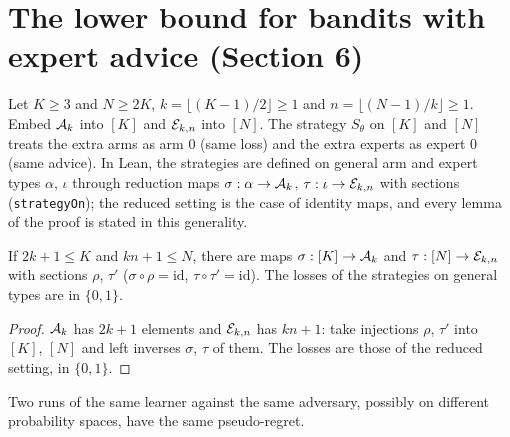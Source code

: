 \chapter{The lower bound for bandits with expert advice (Section 6)}
\label{chap:main}

\begin{definition}
  \label{def:embedding}
  \leanok
  Let $K \ge 3$ and $N \ge 2K$, $k = \lfloor (K - 1)/2 \rfloor \ge 1$ and
  $n = \lfloor (N - 1)/k \rfloor \ge 1$. Embed $\mathcal{A}_k$ into $[K]$ and $\mathcal{E}_{k,n}$ into $[N]$. The
  strategy $S_\theta$ on $[K]$ and $[N]$ treats the extra arms as arm $0$ (same loss) and the
  extra experts as expert $0$ (same advice). In Lean, the strategies are defined on general arm and
  expert types $\alpha$, $\iota$ through reduction maps $\sigma : \alpha \to \mathcal{A}_k$,
  $\tau : \iota \to \mathcal{E}_{k,n}$ with sections (\texttt{strategyOn}); the reduced setting is the
  case of identity maps, and every lemma of the proof is stated in this generality.
\end{definition}

\begin{lemma}
  \label{lem:fin_embedding}
  \leanok
  If $2k + 1 \le K$ and $kn + 1 \le N$, there are maps $\sigma : [K] \to \mathcal{A}_k$ and
  $\tau : [N] \to \mathcal{E}_{k,n}$ with sections $\rho$, $\tau'$ ($\sigma \circ \rho = \mathrm{id}$,
  $\tau \circ \tau' = \mathrm{id}$). The losses of the strategies on general types are in
  $\{0, 1\}$.
\end{lemma}

\begin{proof}
  \leanok
  $\mathcal{A}_k$ has $2k + 1$ elements and $\mathcal{E}_{k,n}$ has $kn + 1$: take injections $\rho$, $\tau'$
  into $[K]$, $[N]$ and left inverses $\sigma$, $\tau$ of them. The losses are those of the
  reduced setting, in $\{0, 1\}$.
\end{proof}

\begin{lemma}
  \label{lem:pseudoRegret_law}
  \leanok
  Two runs of the same learner against the same adversary, possibly on different probability
  spaces, have the same pseudo-regret.
\end{lemma}

